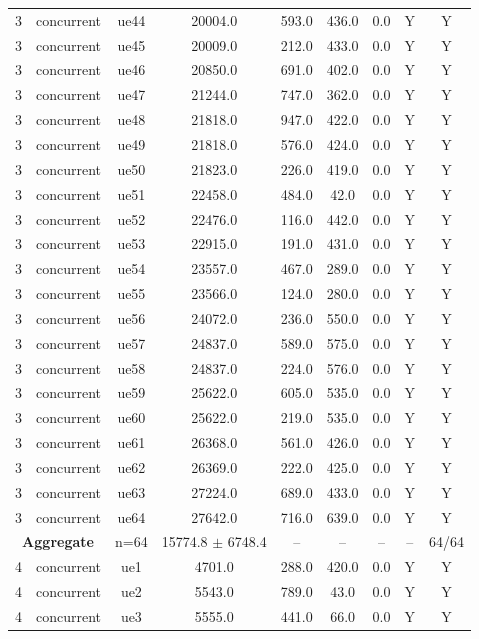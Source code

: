 \begin{table}[ht]
\begin{tabular}{|c|c|c|c|c|c|c|c|c|}
3 & concurrent & ue44 & 20004.0 & 593.0 & 436.0 & 0.0 & Y & Y \\
3 & concurrent & ue45 & 20009.0 & 212.0 & 433.0 & 0.0 & Y & Y \\
3 & concurrent & ue46 & 20850.0 & 691.0 & 402.0 & 0.0 & Y & Y \\
3 & concurrent & ue47 & 21244.0 & 747.0 & 362.0 & 0.0 & Y & Y \\
3 & concurrent & ue48 & 21818.0 & 947.0 & 422.0 & 0.0 & Y & Y \\
3 & concurrent & ue49 & 21818.0 & 576.0 & 424.0 & 0.0 & Y & Y \\
3 & concurrent & ue50 & 21823.0 & 226.0 & 419.0 & 0.0 & Y & Y \\
3 & concurrent & ue51 & 22458.0 & 484.0 & 42.0 & 0.0 & Y & Y \\
3 & concurrent & ue52 & 22476.0 & 116.0 & 442.0 & 0.0 & Y & Y \\
3 & concurrent & ue53 & 22915.0 & 191.0 & 431.0 & 0.0 & Y & Y \\
3 & concurrent & ue54 & 23557.0 & 467.0 & 289.0 & 0.0 & Y & Y \\
3 & concurrent & ue55 & 23566.0 & 124.0 & 280.0 & 0.0 & Y & Y \\
3 & concurrent & ue56 & 24072.0 & 236.0 & 550.0 & 0.0 & Y & Y \\
3 & concurrent & ue57 & 24837.0 & 589.0 & 575.0 & 0.0 & Y & Y \\
3 & concurrent & ue58 & 24837.0 & 224.0 & 576.0 & 0.0 & Y & Y \\
3 & concurrent & ue59 & 25622.0 & 605.0 & 535.0 & 0.0 & Y & Y \\
3 & concurrent & ue60 & 25622.0 & 219.0 & 535.0 & 0.0 & Y & Y \\
3 & concurrent & ue61 & 26368.0 & 561.0 & 426.0 & 0.0 & Y & Y \\
3 & concurrent & ue62 & 26369.0 & 222.0 & 425.0 & 0.0 & Y & Y \\
3 & concurrent & ue63 & 27224.0 & 689.0 & 433.0 & 0.0 & Y & Y \\
3 & concurrent & ue64 & 27642.0 & 716.0 & 639.0 & 0.0 & Y & Y \\
\multicolumn{2}{|c|}{\textbf{Aggregate}} & n=64 & 15774.8 $\pm$ 6748.4 & -- & -- & -- & -- & 64/64 \\
\hline
4 & concurrent & ue1 & 4701.0 & 288.0 & 420.0 & 0.0 & Y & Y \\
4 & concurrent & ue2 & 5543.0 & 789.0 & 43.0 & 0.0 & Y & Y \\
4 & concurrent & ue3 & 5555.0 & 441.0 & 66.0 & 0.0 & Y & Y \\

\end{tabular}
\end{table}

